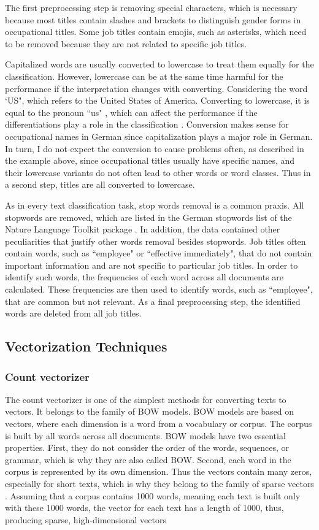\documentclass[12pt, a4paper, titlepage]{article}
\begin{document}
The first preprocessing step is removing special characters, which is necessary because most titles contain slashes and brackets to distinguish gender forms in occupational titles. Some job titles contain emojis, such as asterisks, which need to be removed because they are not related to specific job titles. 

Capitalized words are usually converted to lowercase to treat them equally for the classification. However, lowercase can be at the same time harmful for the performance if the interpretation changes with converting. Considering the word `US", which refers to the United States of America. Converting to lowercase, it is equal to the pronoun ``us" , which can affect the performance if the differentiations play a role in the classification \citep{kowsari2019text}. Conversion makes sense for occupational names in German since capitalization plays a major role in German. In turn, I do not expect the conversion to cause problems often, as described in the example above, since occupational titles usually have specific names, and their lowercase variants do not often lead to other words or word classes. Thus in a second step, titles are all converted to lowercase. 

As in every text classification task, stop words removal is a common praxis. All stopwords are removed, which are listed in the German stopwords list of the Nature Language Toolkit package \citep{bird2009}. In addition, the data contained other peculiarities that justify other words removal besides stopwords. Job titles often contain words, such as ``employee" or ``effective immediately", that do not contain important information and are not specific to particular job titles. In order to identify such words, the frequencies of each word across all documents are calculated. These frequencies are then used to identify words, such as ``employee", that are common but not relevant. As a final preprocessing step, the identified words are deleted from all job titles.  

\subsection{Vectorization Techniques}
\subsubsection*{Count vectorizer}
The count vectorizer is one of the simplest methods for converting texts to vectors. It belongs to the family of \ac{BOW} models. \ac{BOW} models are based on vectors, where each dimension is a word from a vocabulary or corpus. The corpus is built by all words across all documents. \ac{BOW} models have two essential properties. First, they do not consider the order of the words, sequences, or grammar, which is why they are also called \ac{BOW}. Second, each word in the corpus is represented by its own dimension. Thus the vectors contain many zeros, especially for short texts, which is why they belong to the family of sparse vectors \citep{ajose2020}. Assuming that a corpus contains 1000 words, meaning each text is built only with these 1000 words, the vector for each text has a length of 1000, thus, producing sparse, high-dimensional vectors \citep{kulkarni2021, sarkar2016}
\end{document}
